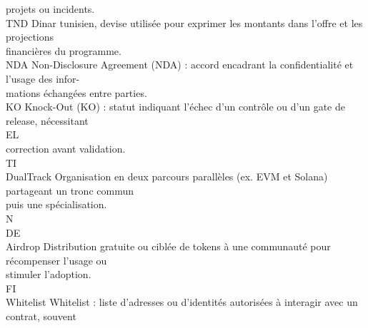 \documentclass[12pt,landscape,a4paper]{article}
\begin{document}
projets ou incidents.\\
\vspace{0.5em}
TND                                     Dinar tunisien, devise utilisée pour exprimer les montants dans l’offre et les projections\\
financières du programme.\\
\vspace{0.5em}
NDA                                     Non-Disclosure Agreement (NDA) : accord encadrant la confidentialité et l’usage des infor-\\
mations échangées entre parties.\\
\vspace{0.5em}
KO                                      Knock-Out (KO) : statut indiquant l’échec d’un contrôle ou d’un gate de release, nécessitant\\
\vspace{0.5em}
\vspace{0.5em}
\vspace{0.5em}
\vspace{0.5em}
EL\\
correction avant validation.\\
\vspace{0.5em}
\vspace{0.5em}
\vspace{0.5em}
\vspace{0.5em}
TI\\
DualTrack                               Organisation en deux parcours parallèles (ex. EVM et Solana) partageant un tronc commun\\
puis une spécialisation.\\
\vspace{0.5em}
\vspace{0.5em}
\vspace{0.5em}
\vspace{0.5em}
N\\
DE\\
Airdrop                                 Distribution gratuite ou ciblée de tokens à une communauté pour récompenser l’usage ou\\
stimuler l’adoption.\\
\vspace{0.5em}
\vspace{0.5em}
\vspace{0.5em}
\vspace{0.5em}
FI\\
Whitelist                               Whitelist : liste d’adresses ou d’identités autorisées à interagir avec un contrat, souvent\\
\end{document}
